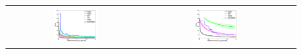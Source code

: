 \documentclass{article}
\newcommand{\nnn}{0.33}
\newcommand{\nnh}{0.23}
\begin{document}
{%
\begin{figure}[t!]
\vspace{-0mm}
\begin{center}
\begin{tabular}{ccc}
   \hspace{-5mm} \includegraphics[width=\nnn\textwidth, height=\nnh\textwidth]{plotsx/collisionx/err-vs-time__param4-shaded.pdf} 
& \hspace{-3mm} \includegraphics[width=\nnn\textwidth, height=\nnh\textwidth]{plotsx/collisionx/err-vs-time__param20-shaded.pdf} 

\end{tabular}
\end{center}
\end{figure}}
\end{document}
